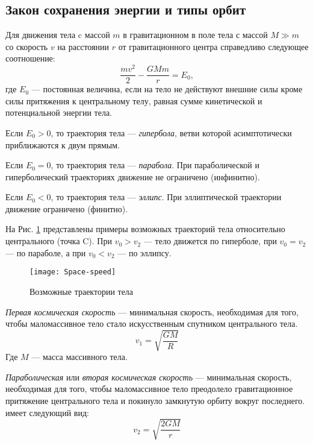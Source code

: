 \subsection{Закон сохранения энергии и типы орбит}
Для движения тела c массой $m$ в гравитационном  в поле тела 
с массой \linebreak $M\gg m$ со скорость $v$ на расстоянии $r$ от 
гравитационного центра справедливо следующее соотношение: 
\begin{equation}
\frac{m v^2}{2}-\frac{GM m }{r}=E_0,
\end{equation}
где $E_0$ --- постоянная величина, если на тело не действуют
внешние силы кроме силы притяжения к центральному телу, 
равная сумме кинетической и потенциальной энергии тела.

Если $E_0>0$, то траектория тела --- {\itshape гипербола}, 
ветви которой асимптотически приближаются к двум прямым.

Если $E_0=0$, то траектория тела --- {\itshape парабола}. При 
параболической и гиперболический траекториях движение не 
ограничено (инфинитно).

Если $E_0<0$, то траектория тела --- {\itshape эллипс}. При 
эллиптической траектории движение ограничено (финитно).



На Рис. \ref{pic:orbits} представлены примеры возможных траекторий тела 
относительно центрального (точка C). При $v_0 > v_{2}$ --- тело движется 
по гиперболе, при $v_0 = v_{2}$ --- по параболе, 
а при $v_0 < v_{2}$ --- по эллипсу.
\begin{figure}[h!]
\centering
\texttt{[image: Space-speed]}
\caption{Возможные траектории тела \label{pic:orbits}}
\end{figure}

\textit{Первая космическая скорость} --- минимальная скорость, необходимая для того, чтобы маломассивное тело стало искусственным спутником центрального тела.
\begin{equation}v_1=\sqrt{\frac{GM}{R}}
\end{equation}
Где $M$ --- масса массивного тела.

\textit{Параболическая} или \textit{вторая космическая скорость} --- минимальная скорость, необходимая для того, чтобы маломассивное тело преодолело гравитационное притяжение центрального тела и покинуло замкнутую орбиту вокруг последнего.
имеет следующий вид:\begin{equation}
v_{2}=\sqrt{\frac{2GM}{r}}
\end{equation}

